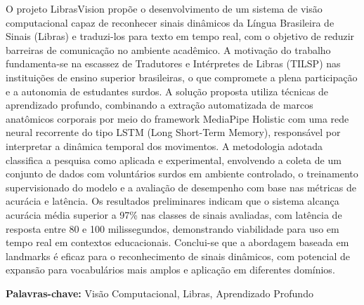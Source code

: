 \documentclass[
	10pt,				%
	openany,
    twoside,			%
	a4paper,			%
    chapter={TITLE},
    section={TITLE},
    subsection={TITLE},
    subsubsection={TITLE},
	english,			%
	french,				%
	spanish,			%
	brazil,				%
	sumario=tradicional
]{abntex2}
\begin{document}
\newpage
\begin{resumo2}
O projeto LibrasVision propõe o desenvolvimento de um sistema de visão computacional capaz de reconhecer sinais dinâmicos da Língua Brasileira de Sinais (Libras) e traduzi-los para texto em tempo real, com o objetivo de reduzir barreiras de comunicação no ambiente acadêmico. A motivação do trabalho fundamenta-se na escassez de Tradutores e Intérpretes de Libras (TILSP) nas instituições de ensino superior brasileiras, o que compromete a plena participação e a autonomia de estudantes surdos. A solução proposta utiliza técnicas de aprendizado profundo, combinando a extração automatizada de marcos anatômicos corporais por meio do framework MediaPipe Holistic com uma rede neural recorrente do tipo LSTM (Long Short-Term Memory), responsável por interpretar a dinâmica temporal dos movimentos. A metodologia adotada classifica a pesquisa como aplicada e experimental, envolvendo a coleta de um conjunto de dados com voluntários surdos em ambiente controlado, o treinamento supervisionado do modelo e a avaliação de desempenho com base nas métricas de acurácia e latência. Os resultados preliminares indicam que o sistema alcança acurácia média superior a 97\% nas classes de sinais avaliadas, com latência de resposta entre 80 e 100 milissegundos, demonstrando viabilidade para uso em tempo real em contextos educacionais. Conclui-se que a abordagem baseada em landmarks é eficaz para o reconhecimento de sinais dinâmicos, com potencial de expansão para vocabulários mais amplos e aplicação em diferentes domínios.
 
\vspace*{20pt}
\textbf{Palavras-chave:} Visão Computacional, Libras, Aprendizado Profundo
\end{resumo2}
\end{document}
